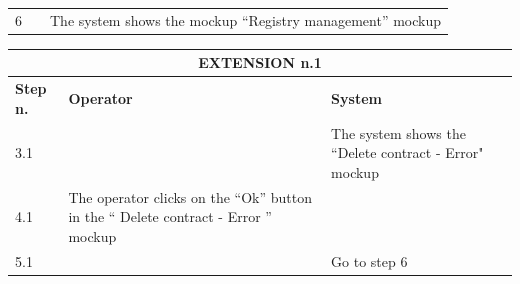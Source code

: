 {{{\begin{center}
\begin{tabular}{|p{2cm}|p{6cm}|p{6cm}|}
				\vspace{1mm} \vspace{1mm} \\
			\hline
				\vspace{1mm} 6 \vspace{1mm} &
				\vspace{1mm} \vspace{1mm} & 
				\vspace{1mm} The system shows the mockup “Registry management” mockup \vspace{1mm} \\
			\hline	
			\end{tabular}

			\begin{tabular}{|p{2cm}|p{6cm}|p{6cm}|}
			\hline
				\multicolumn{3}{|c|}{EXTENSION n.1} \\
			\hline
				\vspace{1mm} \bfseries{Step n.} \vspace{1mm} & 
				\vspace{1mm} \bfseries{Operator} \vspace{1mm} & 
				\vspace{1mm} \bfseries{System} \vspace{1mm}\\
			\hline
				\vspace{1mm} 3.1 \vspace{1mm} &
				\vspace{1mm} \vspace{1mm} & 
				\vspace{1mm} The system shows the “Delete contract - Error" mockup \vspace{1mm} \\
			\hline
				\vspace{1mm} 4.1 \vspace{1mm} &
				\vspace{1mm} The operator clicks on the “Ok”  button  in the “ Delete contract - Error ”  mockup\vspace{1mm} & 
				\vspace{1mm} \vspace{1mm} \\
			\hline
				\vspace{1mm} 5.1 \vspace{1mm} &
				\vspace{1mm} \vspace{1mm} & 
				\vspace{1mm} Go to step 6 \vspace{1mm} \\
			\hline
			\end{tabular}


\end{center}}}}
